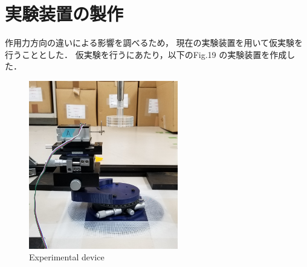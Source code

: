 \documentclass[twocolumn,a4j]{jsarticle}
\begin{document}

\newpage

\section{実験装置の製作}
作用力方向の違いによる影響を調べるため，
現在の実験装置を用いて仮実験を行うこととした．
仮実験を行うにあたり，以下のFig.19 の実験装置を作成した．
\begin{figure}[htbp]
    \footnotesize
    \begin{center}
        \includegraphics[width=65mm]{../images/device_1.jpg}
        \caption{Experimental device}
    \end{center}
\end{figure}
\end{document}
